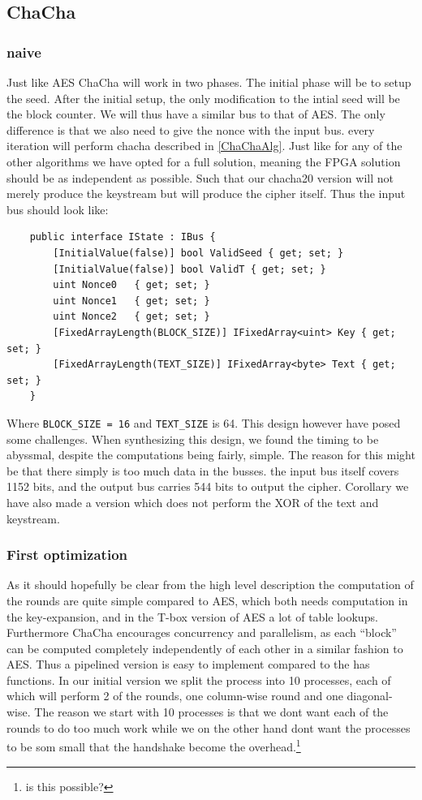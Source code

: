 \documentclass[a4paper]{article}
\begin{document}
\subsection{ChaCha}
\label{sec:org524433f}

\subsubsection{naive}
\label{ChaChaNaive}
Just like AES ChaCha will work in two phases. The initial phase will be to setup the seed. After the initial setup, the only modification to the intial seed will be the block counter. We will thus have a similar bus to that of AES. The only difference is that we also need to give the nonce with the input bus. every iteration will perform chacha described in \ref{ChaChaAlg}. Just like for any of the other algorithms we have opted for a full solution, meaning the FPGA solution should be as independent as possible. Such that our chacha20 version will not merely produce the keystream but will produce the cipher itself. Thus the input bus should look like:
\begin{verbatim}
    public interface IState : IBus {
        [InitialValue(false)] bool ValidSeed { get; set; }
        [InitialValue(false)] bool ValidT { get; set; }
        uint Nonce0   { get; set; }
        uint Nonce1   { get; set; }
        uint Nonce2   { get; set; }
        [FixedArrayLength(BLOCK_SIZE)] IFixedArray<uint> Key { get; set; }
        [FixedArrayLength(TEXT_SIZE)] IFixedArray<byte> Text { get; set; }
    }
\end{verbatim}
Where \texttt{BLOCK\_SIZE = 16} and \texttt{TEXT\_SIZE} is 64. This design however have posed some challenges. When synthesizing this design, we found the timing to be abyssmal, despite the computations being fairly, simple. The reason for this might be that there simply is too much data in the busses. the input bus itself covers 1152 bits, and the output bus carries 544 bits to output the cipher. Corollary we have also made a version which does not perform the XOR of the text and keystream.

\subsubsection{First optimization}
\label{ChaCha1}
As it should hopefully be clear from the high level description the computation of the rounds are quite simple compared to AES, which both needs computation in the key-expansion, and in the T-box version of AES a lot of table lookups. Furthermore ChaCha encourages concurrency and parallelism, as each ``block'' can be computed completely independently of each other in a similar fashion to AES. Thus a pipelined version is easy to implement compared to the has functions. In our initial version we split the process into 10 processes, each of which will perform 2 of the rounds, one column-wise round and one diagonal-wise. The reason we start with 10 processes is that we dont want each of the rounds to do too much work while we on the other hand dont want the processes to be som small that the handshake become the overhead.\footnote{is this possible?}
\end{document}

